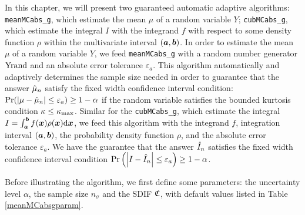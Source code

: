 \documentclass{iitthesis}
\theoremstyle{definition}
\begin{document}
In this chapter, we will present two guaranteed automatic adaptive algorithms: {\tt meanMCabs\_g}, which estimate the mean $\mu$ of a random variable $Y$; {\tt cubMCabs\_g}, which estimate the integral $I$ with the integrand $f$ with respect to some density function $\rho$ within the multivariate interval $(\boldsymbol{a},\boldsymbol{b})$. In order to estimate the mean $\mu$ of a random variable $Y$, we feed {\tt meanMCabs\_g} with a random number generator $\operatorname{Yrand}$ and an absolute error tolerance $\varepsilon_a$. This algorithm automatically and adaptively determines the sample size needed in order to guarantee that the answer $\hat{\mu}_n$ satisfy the fixed width confidence interval condition: $\Pr (\left \lvert \mu-\hat{\mu}_n \right \rvert \leq \varepsilon_a) \geq 1-\alpha$ if the random variable satisfies the bounded kurtosis condition $\kappa \leq \kappa_{\max}$. Similar for the {\tt cubMCabs\_g}, which estimate the integral $I=\int_{\boldsymbol{a}}^{\boldsymbol{b}} f(\boldsymbol{x})\rho(\boldsymbol{x}){\rm d}\boldsymbol{x}$, we feed this algorithm with the integrand $f$, integration interval $(\boldsymbol{a},\boldsymbol{b})$, the probability density function $\rho$, and the absolute error tolerance $\varepsilon_a$. We have the guarantee that the answer $\hat{I}_n$ satisfies the fixed width confidence interval condition $\Pr \left(\left \lvert I-\hat{I}_n \right \rvert \leq \varepsilon_a\right) \geq 1-\alpha$.

 \label{sec:meanMCabsg}

Before illustrating the algorithm, we first define some parameters: the uncertainty level $\alpha$, the sample size $n_{\sigma}$ and the SDIF $\mathfrak{C}$, with default values listed in Table \ref{meanMCabsgparam}.
\end{document}
